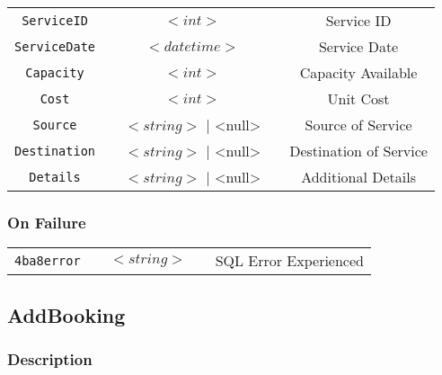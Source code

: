 \documentclass[a4paper,12pt]{article}
\begin{document}
\begin{tabular}{ccccc}
\verb!ServiceID! & \vspace{15mm} & $<int>$ & \vspace{15mm} & Service ID \\
\verb!ServiceDate! & \vspace{15mm} & $<datetime>$ & \vspace{15mm} & Service Date \\
\verb!Capacity! & \vspace{15mm} & $<int>$ & \vspace{15mm} & Capacity Available \\
\verb!Cost! & \vspace{15mm} & $<int>$ & \vspace{15mm} & Unit Cost \\
\verb!Source! & \vspace{15mm} & $<string>$ | <null> & \vspace{15mm} & Source of Service \\
\verb!Destination! & \vspace{15mm} & $<string>$ | <null> & \vspace{15mm} & Destination of Service \\
\verb!Details! & \vspace{15mm} & $<string>$ | <null> & \vspace{15mm} & Additional Details \\
\end{tabular}
\subsubsection{On Failure}

\begin{tabular}{ccccc}
\verb!4ba8error! & \vspace{15mm} & $<string>$ & \vspace{15mm} & SQL Error Experienced \\
\end{tabular}


\subsection{AddBooking}

\subsubsection{Description}
\end{document}
